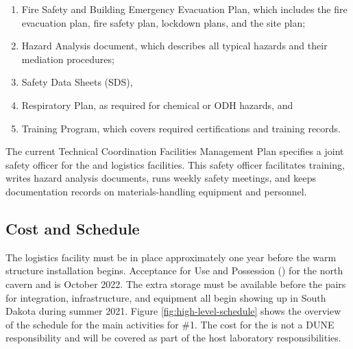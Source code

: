 \begin{enumerate}
\item	Fire Safety and Building Emergency Evacuation Plan, which includes the fire evacuation plan, fire safety plan,  lockdown plans, and the site plan;
\item	Hazard Analysis document, which describes all typical hazards and their mediation %
procedures; 
\item	%
Safety Data Sheets (SDS), 
\item	Respiratory Plan, as required for chemical or ODH hazards, and 
\item	Training Program, which covers required certifications and  training records.
\end{enumerate}

The current Technical Coordination Facilities Management Plan  specifies a joint safety officer for %
the  and logistics facilities. This safety officer facilitates training, writes hazard analysis documents, runs weekly safety meetings, and keeps documentation records on materials-handling equipment and personnel. 




\subsection{Cost and Schedule} %
\label{sec:fdsp-tc-log-cost}


The logistics facility must be in place approximately one year before the warm structure installation begins.  
Acceptance for Use and Possession ()  for the north cavern and  is October 2022.  
The extra storage must be available before the  pairs for integration,  infrastructure, and equipment all begin showing up in  South Dakota during summer 2021. 
Figure \ref{fig:high-level-schedule} shows the overview of the schedule for the main activities for  \#1. 
The cost for the  is not a DUNE responsibility and will be covered as part of the host laboratory responsibilities.


